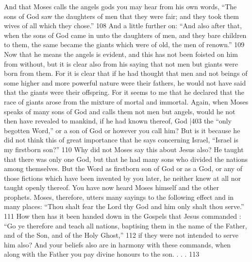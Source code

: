 And that Moses calls the angels gods you may hear from his own words, ``The sons of God saw the daughters of men that they were fair; and they took them wives of all which they chose.''
108 And a little further on: ``And also after that, when the sons of God came in unto the daughters of men, and they bare children to them, the same became the giants which were of old, the men of renown.''
109 Now that he means the angels is evident, and this has not been foisted on him from without, but it is clear also from his saying that not men but giants were born from them. For it is clear that if he had thought that men and not beings of some higher and more powerful nature were their fathers, he would not have said that the giants were their offspring. For it seems to me that he declared that the race of giants arose from the mixture of mortal and immortal. Again, when Moses speaks of many sons of God and calls them not men but angels, would he not then have revealed to mankind, if he had known thereof, God
|403 the ``only begotten Word,'' or a son of God or however you call him? But is it because he did not think this of great importance that he says concerning Israel, ``Israel is my firstborn son?''
110 Why did not Moses say this about Jesus also? He taught that there was only one God, but that he had many sons who divided the nations among themselves. But the Word as firstborn son of God or as a God, or any of those fictions which have been invented by you later, he neither knew at all nor taught openly thereof. You have now heard Moses himself and the other prophets. Moses, therefore, utters many sayings to the following effect and in many places: ``Thou shalt fear the Lord thy God and him only shalt thou serve.''
111 How then has it been handed down in the Gospels that Jesus commanded : ``Go ye therefore and teach all nations, baptising them in the name of the Father, and of the Son, and of the Holy Ghost,''
112 if they were not intended to serve him also? And your beliefs also are in harmony with these commands, when along with the Father you pay divine honours to the son. . . . 113

